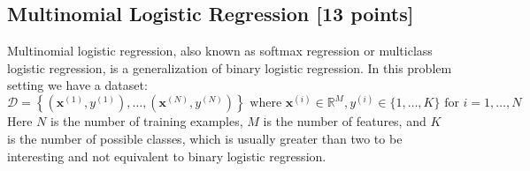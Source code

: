 \documentclass[11pt]{article}
\numberwithin{equation}{section} %
\numberwithin{figure}{section} %
\numberwithin{table}{section} %
\newcommand{\Rb}{\mathbb{R}}
\newcommand{\xv}{\mathbf{x}}
\begin{document}
\subsection{Multinomial Logistic Regression [13 points]}
Multinomial logistic regression, also known as softmax regression or multiclass logistic regression, is a generalization of binary logistic regression. In this problem setting we have a dataset:
\[
\mathcal{D} = \left\{\left(\xv^{(1)}, y^{(1)}\right), \ldots, \left(\xv^{(N)}, y^{(N)}\right)\right\} \text{ where } \xv^{(i)} \in \Rb^M, y^{(i)} \in \{1, \ldots, K\} \text{ for } i = 1, \ldots, N
\]
Here $N$ is the number of training examples, $M$ is the number of features, and $K$ is the number of possible classes, which is usually greater than two to be interesting and not equivalent to binary logistic regression.
\end{document}
